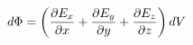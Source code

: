 \documentclass[preview]{standalone}
\begin{document}
\begin{align*}
\special{dvisvgm:raw <g id='unique000'>}d\Phi=\left(\frac{\partial E_x}{\partial x}+\frac{\partial E_y}{\partial y}+\frac{\partial E_z}{\partial z}\right)dV\special{dvisvgm:raw </g>}
\end{align*}
\end{document}
